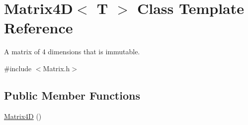 \hypertarget{class_matrix4_d}{}\section{Matrix4\+D$<$ T $>$ Class Template Reference}
\label{class_matrix4_d}


A matrix of 4 dimensions that is immutable.  




{\ttfamily \#include $<$Matrix.\+h$>$}

\subsection*{Public Member Functions}
\begin{DoxyCompactItemize}
\item 
\hypertarget{class_matrix4_d_ad499328b28baa54c3cc63136d9f32505}{}\hyperlink{class_matrix4_d_ad499328b28baa54c3cc63136d9f32505}{Matrix4\+D} ()\label{class_matrix4_d_ad499328b28baa54c3cc63136d9f32505}


\end{DoxyCompactItemize}

